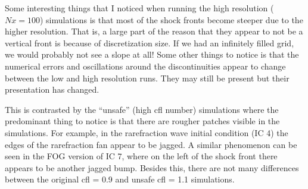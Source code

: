 \documentclass{article}
\begin{document}
Some interesting things that I noticed when running the high resolution ($Nx =
100$) simulations is that most of the shock fronts become steeper due to the
higher resolution. That is, a large part of the reason that they appear to not
be a vertical front is because of discretization size. If we had an infinitely
filled grid, we would probably not see a slope at all! Some other things to
notice is that the numerical errors and oscillations around the discontinuities
appear to change between the low and high resolution runs. They may still be
present but their presentation has changed. 

This is contrasted by the ``unsafe'' (high cfl number) simulations where the
predominant thing to notice is that there are rougher patches visible in the
simulations. For example, in the rarefraction wave initial condition (IC 4) the
edges of the rarefraction fan appear to be jagged. A similar phenomenon can be
seen in the FOG version of IC 7, where on the left of the shock front there
appears to be another jagged bump. Besides this, there are not many differences
between the original cfl = 0.9 and unsafe cfl = 1.1 simulations. 
\end{document}
